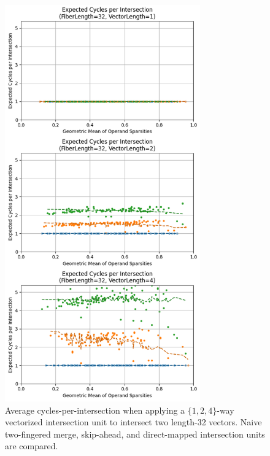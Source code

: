 \begin{figure}[H]
\includegraphics[width=0.75\textwidth]{figures/expected_cycles_F32.png}
\caption{Average cycles-per-intersection when applying a $\{1,2,4\}$-way vectorized intersection unit to intersect two length-32 vectors. Naive two-fingered merge, skip-ahead, and direct-mapped intersection units are compared.}
\label{fig:expected_cycles_F32}
\end{figure}